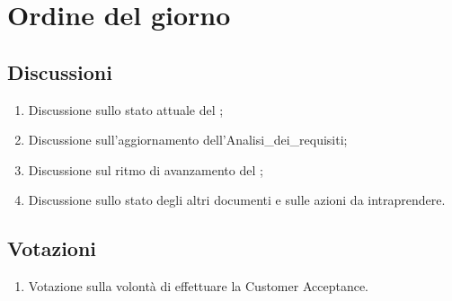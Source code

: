 \section{Ordine del giorno} \label{sec:agenda}
\subsection{Discussioni} \label{subsec:discussione}
\begin{enumerate}
    \item Discussione sullo stato attuale del ;
    \item Discussione sull'aggiornamento dell'Analisi\_dei\_requisiti;
    \item Discussione sul ritmo di avanzamento del ;
    \item Discussione sullo stato degli altri documenti e sulle azioni da intraprendere.
\end{enumerate}

\subsection{Votazioni} \label{subsec:votazione}
\begin{enumerate}
    \item Votazione sulla volontà di effettuare la Customer Acceptance.
\end{enumerate}